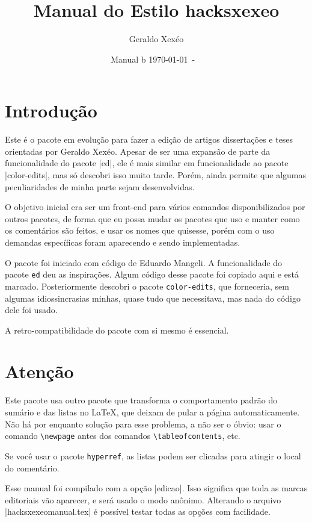 \documentclass{article}
\title{Manual do Estilo hacksxexeo \hacksxexeoversion}
\author{Geraldo Xexéo}
\date{Manual \hacksxexeoversion b \today\ - \ \currenttime}
\begin{document}
    
    \maketitle
    
    \tableofcontents
    
    \section{Introdução}
    
    Este é o  pacote em evolução para fazer a edição de artigos dissertações e teses orientadas por Geraldo Xexéo. Apesar de ser uma expansão de parte da funcionalidade do pacote |ed|, ele é mais similar em funcionalidade ao pacote |color-edits|, mas só descobri isso muito tarde. Porém, ainda permite que algumas peculiaridades de minha parte sejam desenvolvidas.
    
    O objetivo inicial era ser um front-end para vários comandos disponibilizados por outros pacotes, de forma que eu possa mudar os pacotes que uso e manter como os comentários são feitos, e usar os nomes que quisesse, porém com o uso demandas específicas foram aparecendo e sendo implementadas.
    
    O pacote foi iniciado com código de Eduardo Mangeli. A funcionalidade do pacote \verb|ed| deu as inspirações. Algum código desse pacote foi copiado aqui e está marcado. Posteriormente descobri o pacote \verb|color-edits|, que forneceria, sem algumas idiossincrasias minhas, quase tudo que necessitava, mas nada do código dele foi usado.
    
    A retro-compatibilidade do pacote com si mesmo é essencial.
    
    \section{Atenção}
    
    Este pacote usa outro pacote que transforma o comportamento padrão do sumário e das listas no \LaTeX, que deixam de pular a página automaticamente. Não há por enquanto solução para esse problema, a não ser o óbvio: usar o comando \verb!\newpage! antes dos comandos \verb!\tableofcontents!, etc.
    
    Se você usar o pacote \verb!hyperref!, as listas podem ser clicadas para atingir o local do comentário.
    
    Esse manual foi compilado com a opção |edicao|. Isso significa que toda as marcas editoriais vão aparecer, e será usado o modo anônimo. Alterando o arquivo |hacksxexeomanual.tex| é possível testar todas as opções com facilidade.
    
\end{document}
